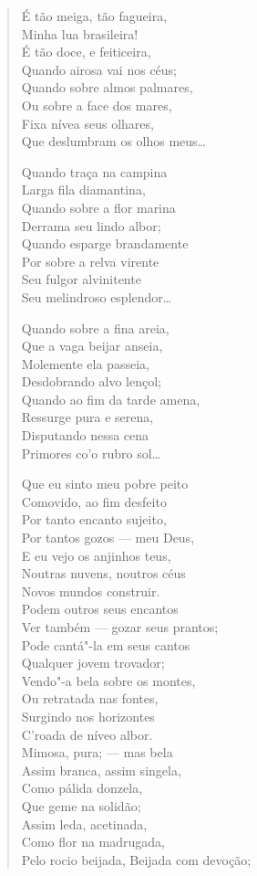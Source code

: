 \begin{verse}
É tão meiga, tão fagueira,\\
Minha lua brasileira!\\
É tão doce, e feiticeira,\\
Quando airosa vai nos céus;\\
Quando sobre almos palmares,\\
Ou sobre a face dos mares,\\
Fixa nívea seus olhares,\\
Que deslumbram os olhos meus\ldots{}

Quando traça na campina\\
Larga fila diamantina,\\
Quando sobre a flor marina\\
Derrama seu lindo albor;\\
Quando esparge brandamente\\
Por sobre a relva virente\\
Seu fulgor alvinitente\\
Seu melindroso esplendor\ldots{}

Quando sobre a fina areia,\\
Que a vaga beijar anseia,\\
Molemente ela passeia,\\
Desdobrando alvo lençol;\\
Quando ao fim da tarde amena,\\
Ressurge pura e serena,\\
Disputando nessa cena\\
Primores co'o rubro sol\ldots{}

Que eu sinto meu pobre peito\\
Comovido, ao fim desfeito\\
Por tanto encanto sujeito,\\
Por tantos gozos --- meu Deus,\\
E eu vejo os anjinhos teus,\\
Noutras nuvens, noutros céus\\
Novos mundos construir.\\
Podem outros seus encantos\\
Ver também --- gozar seus prantos;\\
Pode cantá"-la em seus cantos\\
Qualquer jovem trovador;\\
Vendo"-a bela sobre os montes,\\
Ou retratada nas fontes,\\
Surgindo nos horizontes\\
C'roada de níveo albor.\\
Mimosa, pura; --- mas bela\\
Assim branca, assim singela,\\
Como pálida donzela,\\
Que geme na solidão;\\
Assim leda, acetinada,\\
Como flor na madrugada,\\
Pelo rocio beijada, Beijada com devoção;


\end{verse}
